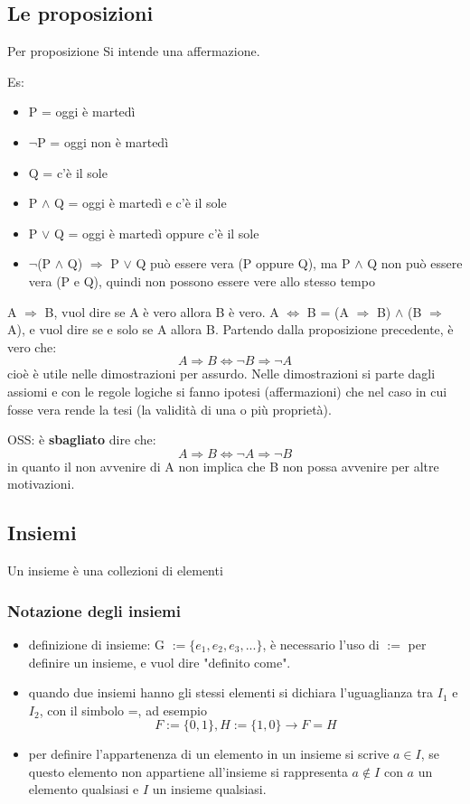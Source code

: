 \documentclass[a4paper,12pt]{article}
\begin{document}
	\subsection{Le proposizioni}
	Per proposizione Si intende una affermazione.
	
	Es:
		\begin{itemize}
			\item P = oggi è martedì
			\item $\neg$P = oggi non è martedì
			\item Q = c'è il sole
			\item P $\wedge$ Q = oggi è martedì e c'è il sole
			\item P $\vee$ Q = oggi è martedì oppure c'è il sole
			
			\item $\neg$(P $\wedge$ Q) $\Rightarrow$ P $\vee$ Q può essere vera (P oppure Q), ma P $\wedge$ Q non può essere vera (P e Q), quindi non possono essere vere allo stesso tempo
		\end{itemize}
	A $\Rightarrow$ B, vuol dire se A è vero allora B è vero. \newline
	A $\iff$ B = (A $\Rightarrow$ B) $\wedge$ (B $\Rightarrow$ A), e vuol dire se e solo se A allora B.\newline
	Partendo dalla proposizione precedente, è vero che:
	\[
	A \Rightarrow B \iff \neg B \Rightarrow \neg A
	\]
	cioè è utile nelle dimostrazioni per assurdo. Nelle dimostrazioni si parte dagli assiomi e con le regole logiche si fanno ipotesi (affermazioni) che nel caso in cui fosse vera rende la tesi (la validità di una o più proprietà).
	
	OSS: è \textbf{sbagliato} dire che:
	\[
	A \Rightarrow B \iff \neg A \Rightarrow \neg B
	\]
	in quanto il non avvenire di A non implica che B non possa avvenire per altre motivazioni.
	
	\subsection{Insiemi}
	Un insieme è una collezioni di elementi
	\subsubsection{Notazione degli insiemi}
	\begin{itemize}
		\item definizione di insieme: G $:= \{e_1, e_2, e_3, ...\}$, è necessario l'uso di $:=$ per definire un insieme, e vuol dire "definito come".
		\item quando due insiemi hanno gli stessi elementi si dichiara l'uguaglianza tra $I_1$ e $I_2$, con il simbolo =, ad esempio
		\[
		F := \{0, 1\}, H := \{1, 0\} \rightarrow F = H
		\]
		\item per definire l'appartenenza di un elemento in un insieme si scrive $a \in I$,  se questo elemento non appartiene all'insieme si rappresenta $a \not \in I$ con $a$ un elemento qualsiasi e $I$ un insieme qualsiasi.
		
	\end{itemize}
\end{document}
